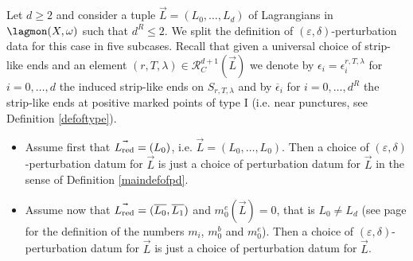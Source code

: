 	Let $d\geq 2$ and consider a tuple $\vec{L}=(L_0,\ldots, L_d)$ of Lagrangians in $\lagmon(X,\omega)$ such that $d^R\leq 2$. We split the definition of $(\varepsilon,\delta)$-perturbation data for this case in five subcases. Recall that given a universal choice of strip-like ends and an element $(r,T,\lambda)\in \mathcal{R}^{d+1}_C(\vec{L})$ we denote by $\epsilon_i=\epsilon_i^{r,T,\lambda}$ for $i=0,\ldots, d$ the induced strip-like ends on $S_{r,T,\lambda}$ and by $\overline{\epsilon}_i$ for $i=0,\ldots, d^R$ the strip-like ends at positive marked points of type I (i.e. near punctures, see Definition \ref{defoftype}).
	
	\begin{itemize}
		\item[\textbf{Case 1}] Assume first that $\vec{L_\textnormal{red}}=(L_0)$, i.e. $\vec{L}=(L_0,\ldots, L_0)$. Then a choice of $(\varepsilon,\delta)$-perturbation datum for $\vec{L}$ is just a choice of perturbation datum for $\vec{L}$ in the sense of Definition \ref{maindefofpd}.
		\item[\textbf{Case 2}] Assume now that $\vec{L_\textnormal{red}}=(\overline{L_0},\overline{L_1})$ and $m_0^e(\vec{L})=0$, that is $L_0\neq L_d$ (see page \pageref{defofmis} for the definition of the numbers $m_i$, $m_0^b$ and $m_0^e$). Then a choice of $(\varepsilon,\delta)$-perturbation datum for $\vec{L}$ is just a choice of perturbation datum for $\vec{L}$.
		

\end{itemize}
